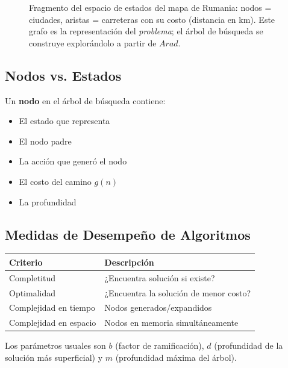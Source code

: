 \begin{figure}[H]
\centering
{}
\caption{Fragmento del espacio de estados del mapa de Rumania: nodos = ciudades, aristas = carreteras con su costo
(distancia en km). Este grafo es la representación del \textit{problema}; el árbol de búsqueda se construye
explorándolo a partir de $Arad$.}
\end{figure}

\subsection{Nodos vs. Estados}

Un \textbf{nodo} en el árbol de búsqueda contiene:
\begin{itemize}
    \item El estado que representa
    \item El nodo padre
    \item La acción que generó el nodo
    \item El costo del camino $g(n)$
    \item La profundidad
\end{itemize}

\subsection{Medidas de Desempeño de Algoritmos}

\begin{tabular}{ll}
\toprule
\textbf{Criterio} & \textbf{Descripción} \\
\midrule
Completitud & ¿Encuentra solución si existe? \\
Optimalidad & ¿Encuentra la solución de menor costo? \\
Complejidad en tiempo & Nodos generados/expandidos \\
Complejidad en espacio & Nodos en memoria simultáneamente \\
\bottomrule
\end{tabular}

Los parámetros usuales son $b$ (factor de ramificación), $d$ (profundidad de la solución más superficial) y $m$ (profundidad máxima del árbol).
